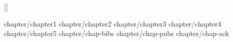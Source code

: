 \documentclass[12pt,a4paper,fancyhdr,hyperref,fntef]{ctexbook}
\begin{document}
\frontmatter

%




\pagestyle{plain} 
\def\thepage{\xiaowuzi\roman{page}}



{
\titleformat{\chapter}[hang]{\vspace{-1.8cm}\chapterfmt}{\chaptername}{1em}{}[\vspace{-1cm}] %
\baselineskip=20pt
\tableofcontents
}

\clearpage

\mainmatter

\setcounter{page}{1}
\setcounter{chapter}{0}
\def\thepage{\xiaowuzi\arabic{page}}

 {chapter/chapter1}
 {chapter/chapter2}
 {chapter/chapter3}
 {chapter/chapter4}
 {chapter/chapter5}
%
 {chapter/chap-bibs}
 {chapter/chap-pubs}
 {chapter/chap-ack}
\end{document}
